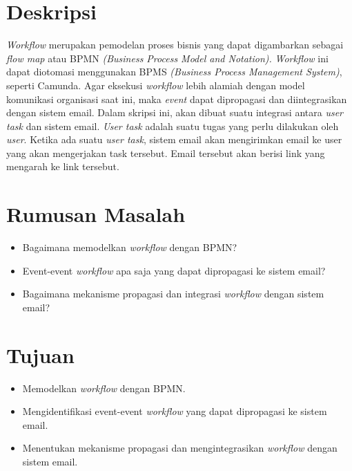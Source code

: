 \documentclass[a4paper,twoside]{article}
\begin{document}
\title{\@judultopik}
\author{\nama \textendash \@npm} 

\newcommand{\nama}{Lucky Senjaya Darmawan}
\newcommand{\@npm}{2012730009}
\newcommand{\@judultopik}{Studi dan Integrasi Workflow menggunakan BPMS dan Sistem Email} %
\newcommand{\jumpemb}{1} %
\newcommand{\tanggal}{20/01/2016}


\maketitle


\section{Deskripsi}
\textit{Workflow} merupakan pemodelan proses bisnis yang dapat digambarkan sebagai \textit{flow map} atau BPMN \textit{(Business Process Model and Notation).} \textit{Workflow} ini dapat diotomasi menggunakan BPMS \textit{(Business Process Management System)}, seperti Camunda. Agar eksekusi \textit{workflow} lebih alamiah dengan model komunikasi organisasi saat ini, maka \textit{event} dapat dipropagasi dan diintegrasikan dengan sistem email. 
Dalam skripsi ini, akan dibuat suatu integrasi antara \textit{user task} dan sistem email. \textit{User task} adalah suatu tugas yang perlu dilakukan oleh \textit{user}. Ketika ada suatu \textit{user task}, sistem email akan mengirimkan email ke user yang akan mengerjakan task tersebut. Email tersebut akan berisi link yang mengarah ke link tersebut.

\section{Rumusan Masalah}
\begin{itemize}
	\item Bagaimana memodelkan \textit{workflow} dengan BPMN?
	\item Event-event \textit{workflow} apa saja yang dapat dipropagasi ke sistem email?
	\item Bagaimana mekanisme propagasi dan integrasi \textit{workflow} dengan sistem email?
\end{itemize}
\section{Tujuan}
\begin{itemize}
	\item Memodelkan \textit{workflow} dengan BPMN.
	\item Mengidentifikasi event-event \textit{workflow} yang dapat dipropagasi ke sistem email.
	\item Menentukan mekanisme propagasi dan mengintegrasikan \textit{workflow} dengan sistem email.
\end{itemize}
\end{document}
